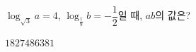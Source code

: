 $\log_{\sqrt{3}} a=4$, $\log_{\frac{1}{9}} b=-\dfrac{1}{2}$일 때, $ab$의 값은?
\begin{choices32}{$18$}{$27$}{$48$}{$63$}{$81$}\end{choices32}
